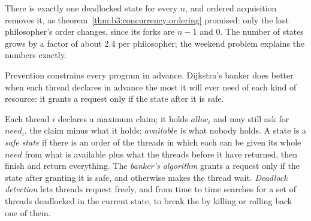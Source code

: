 \begin{omfigure}
\par{}
\end{omfigure}

There is exactly one deadlocked state for every $n$, and ordered acquisition removes it, as theorem~\ref{thm:b3:concurrency:ordering} promised: only the last philosopher's order changes, since its forks are $n - 1$ and $0$. The number of states grows by a factor of about 2.4 per philosopher; the weekend problem explains the numbers exactly.

Prevention constrains every program in advance. Dijkstra's banker does better when each thread declares in advance the most it will ever need of each kind of resource: it grants a request only if the state after it is safe. %

\begin{definition}\label{def:b3:concurrency:banker}
Each thread $i$ declares a maximum claim; it holds $\mathit{alloc}_i$ and may still ask for $\mathit{need}_i$, the claim minus what it holds; $\mathit{available}$ is what nobody holds. A state is a \emph{safe state} if there is an order of the threads in which each can be given its whole $\mathit{need}$ from what is available plus what the threads before it have returned, then finish and return everything. The \emph{banker's algorithm} grants a request only if the state after granting it is safe, and otherwise makes the thread wait. \emph{Deadlock detection} lets threads request freely, and from time to time searches for a set of threads deadlocked in the current state, to break the  by killing or rolling back one of them.
\end{definition}

